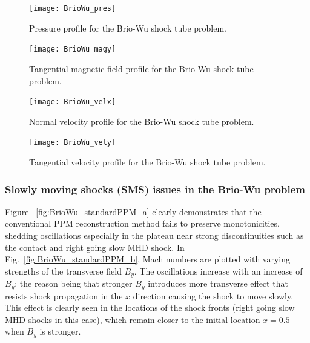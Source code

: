 \begin{figure}[!ht]
\begin{center}
{\leavevmode\texttt{[image: BrioWu\_pres]}}
\end{center}
\caption{\label{Fig:bw_pressure} Pressure profile for the
Brio-Wu shock tube problem. }
\end{figure}

\begin{figure}[!ht]
\begin{center}
{\leavevmode\texttt{[image: BrioWu\_magy]}}
\end{center}
\caption{\label{Fig:magnetic} Tangential magnetic
field profile for the Brio-Wu shock tube problem.}
\end{figure}

\begin{figure}[!ht]
\begin{center}
{\leavevmode\texttt{[image: BrioWu\_velx]}}
\end{center}
\caption{\label{Fig:bw_velx} Normal velocity profile
for the Brio-Wu shock tube problem.
}
\end{figure}

\begin{figure}[!ht]
\begin{center}
{\leavevmode\texttt{[image: BrioWu\_vely]}}
\end{center}
\caption{\label{Fig:bw_vely} Tangential velocity profile
for the Brio-Wu shock tube problem.
}
\end{figure}

\subsubsection{Slowly moving shocks (SMS) issues in the Brio-Wu problem}
\makeUsMath

Figure ~\ref{fig:BrioWu_standardPPM_a} clearly demonstrates that the
conventional PPM reconstruction method fails to preserve
monotonicities, shedding oscillations  especially in the plateau
near strong discontinuities such as the contact and right
going slow MHD shock. In Fig.~\ref{fig:BrioWu_standardPPM_b}, Mach
numbers are plotted with varying strengths of the transverse field
$B_y$. The oscillations increase with an increase of $B_y$;
the reason being that stronger $B_y$ introduces more transverse effect
that resists shock propagation in the $x$ direction causing the
shock to move slowly. This effect is clearly seen in the locations of
the shock fronts (right going slow MHD shocks in this case), which
remain closer to the initial location $x=0.5$ when $B_y$ is
stronger. %


